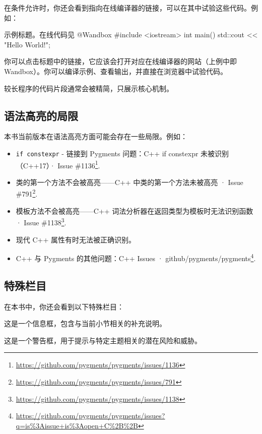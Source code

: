 在条件允许时，你还会看到指向在线编译器的链接，可以在其中试验这些代码。例如：

\begin{codeboxt}{示例标题。在线代码见 @Wandbox}
#include <iostream>
int main() {
std::cout << "Hello World!";
}
\end{codeboxt}

你可以点击标题中的链接，它应该会打开对应在线编译器的网站（上例中即 Wandbox）。你可以编译示例、查看输出，并直接在浏览器中试验代码。

较长程序的代码片段通常会被精简，只展示核心机制。

\subsection{语法高亮的局限}

本书当前版本在语法高亮方面可能会存在一些局限。例如：

\begin{itemize}
\item \texttt{if constexpr} - 链接到 Pygments 问题：C++ if constexpr 未被识别（C++17）· Issue \#1136\footnote{\url{https://github.com/pygments/pygments/issues/1136}}.
\item 类的第一个方法不会被高亮——C++ 中类的第一个方法未被高亮 · Issue \#791\footnote{\url{https://github.com/pygments/pygments/issues/791}}.
\item 模板方法不会被高亮——C++ 词法分析器在返回类型为模板时无法识别函数 · Issue \#1138\footnote{\url{https://github.com/pygments/pygments/issues/1138}}.
\item 现代 C++ 属性有时无法被正确识别。
\item C++ 与 Pygments 的其他问题：C++ Issues · github/pygments/pygments\footnote{\url{https://github.com/pygments/pygments/issues?q=is\%3Aissue+is\%3Aopen+C\%2B\%2B}}.
\end{itemize}

\subsection{特殊栏目}

在本书中，你还会看到以下特殊栏目：

\begin{myInfoBox}
这是一个信息框，包含与当前小节相关的补充说明。
\end{myInfoBox}

\begin{myWarnBox}
这是一个警告框，用于提示与特定主题相关的潜在风险和威胁。
\end{myWarnBox}

